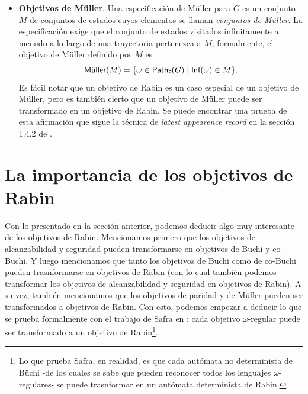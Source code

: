 \begin{itemize}
	\item \textbf{Objetivos de Müller}. Una especificación de Müller para \(G\) es un conjunto \(M\) de conjuntos de estados cuyos elementos se llaman \emph{conjuntos de Müller}. La especificación exige que el conjunto de estados visitados infinitamente a menudo a lo largo de una trayectoria pertenezca a \(M\); formalmente, el objetivo de Müller definido por \(M\) es $$\Muller(M)=\{\omega\in \Paths(G) \mid \Inf(\omega)\in M\}.$$ Es fácil notar que un objetivo de Rabin es un caso especial de un objetivo de Müller, pero es también cierto que un objetivo de Müller puede ser transformado en un objetivo de Rabin. Se puede encontrar una prueba de esta afirmación que sigue la técnica de \emph{latest appearence record} en la sección 1.4.2 de \cite{AutomataLogicsInfiniteGames}.

\end{itemize}





\section{La importancia de los objetivos de Rabin}

Con lo presentado en la sección anterior, podemos deducir algo muy interesante
de los objetivos de Rabin. Mencionamos primero que los objetivos de
alcanzabilidad y seguridad pueden transformarse en objetivos de Büchi y
co-Büchi. Y luego mencionamos que tanto los objetivos de Büchi como de co-Büchi
pueden trasnformarse en objetivos de Rabin (con lo cual también podemos
transformar los objetivos de alcanzabilidad y seguridad en objetivos de Rabin).
A su vez, también mencionamos que los objetivos de paridad y de Müller pueden
ser transformados a objetivos de Rabin. Con esto, podemos empezar a deducir lo
que se prueba formalmente con el trabajo de Safra en \cite{Safra}: cada
objetivo $\omega$-regular puede ser transformado a un objetivo de
Rabin\footnote{Lo que prueba Safra, en realidad, es que cada autómata no
	determinista de Büchi -de los cuales se sabe que pueden reconocer todos los
	lenguajes $\omega$-regulares- se puede trasnformar en un autómata determinista
	de Rabin.}.

